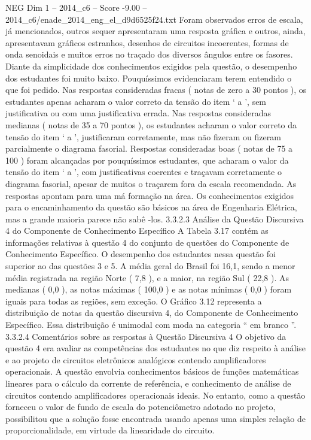 \begin{textsample}{NEG Dim 1 – 2014\_c6 – Score -9.00 – 2014\_c6/enade\_2014\_eng\_el\_d9d6525f24.txt}
Foram observados erros de escala, já mencionados, outros sequer apresentaram uma resposta gráfica e outros, ainda, apresentavam gráficos estranhos, desenhos de circuitos incoerentes, formas de onda senoidais e muitos erros no traçado dos diversos ângulos entre os fasores.
Diante da simplicidade dos conhecimentos exigidos pela questão, o desempenho dos estudantes foi muito baixo.
Pouquíssimos evidenciaram terem entendido o que foi pedido.
Nas respostas consideradas fracas ( notas de zero a 30 pontos ), os estudantes apenas acharam o valor correto da tensão do item ‘ a ’, sem justificativa ou com uma justificativa errada.
Nas respostas consideradas medianas ( notas de 35 a 70 pontos ), os estudantes acharam o valor correto da tensão do item ‘ a ’, justificaram corretamente, mas não fizeram ou fizeram parcialmente o diagrama fasorial.
Respostas consideradas boas ( notas de 75 a 100 ) foram alcançadas por pouquíssimos estudantes, que acharam o valor da tensão do item ‘ a ’, com justificativas coerentes e traçavam corretamente o diagrama fasorial, apesar de muitos o traçarem fora da escala recomendada.
As respostas apontam para uma má formação na área.
Os conhecimentos exigidos para o encaminhamento da questão são básicos na área de Engenharia Elétrica, mas a grande maioria parece não sabê -los. 3.3.2.3 Análise da Questão Discursiva 4 do Componente de Conhecimento Específico A Tabela 3.17 contém as informações relativas à questão 4 do conjunto de questões do Componente de Conhecimento Específico.
O desempenho dos estudantes nessa questão foi superior ao das questões 3 e 5.
A média geral do Brasil foi 16,1, sendo a menor média registrada na região Norte ( 7,8 ), e a maior, na região Sul ( 22,8 ).
As medianas ( 0,0 ), as notas máximas ( 100,0 ) e as notas mínimas ( 0,0 ) foram iguais para todas as regiões, sem exceção.
O Gráfico 3.12 representa a distribuição de notas da questão discursiva 4, do Componente de Conhecimento Específico.
Essa distribuição é unimodal com moda na categoria “ em branco ”. 3.3.2.4 Comentários sobre as respostas à Questão Discursiva 4 O objetivo da questão 4 era avaliar as competências dos estudantes no que diz respeito à análise e ao projeto de circuitos eletrônicos analógicos contendo amplificadores operacionais.
A questão envolvia conhecimentos básicos de funções matemáticas lineares para o cálculo da corrente de referência, e conhecimento de análise de circuitos contendo amplificadores operacionais ideais.
No entanto, como a questão forneceu o valor de fundo de escala do potenciômetro adotado no projeto, possibilitou que a solução fosse encontrada usando apenas uma simples relação de proporcionalidade, em virtude da linearidade do circuito.

\end{textsample}
